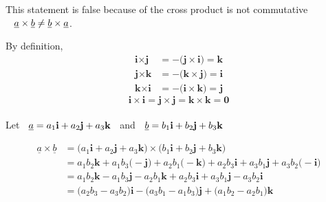 \documentclass[11pt,a4paper]{article}
\begin{document}
This statement is false because of the cross product is not commutative $\hspace{0.3cm} \underline{a}\times \underline{b} \neq \underline{b}\times \underline{a}$.

\begin{figure}[H]
\centering
{}
\end{figure}


















By definition, 
\begin{align*}
\textbf{i} \times \textbf{j} & = -\big(\textbf{j} \times \textbf{i}\big) = \textbf{k}\\
\textbf{j} \times \textbf{k} & = -\big(\textbf{k} \times \textbf{j}\big) = \textbf{i}\\
\textbf{k} \times \textbf{i} & = -\big(\textbf{i} \times \textbf{k}\big) = \textbf{j}
\end{align*}
$$\textbf{i} \times \textbf{i} = \textbf{j} \times \textbf{j} = \textbf{k} \times \textbf{k} = \textbf{0}$$\\



Let $\hspace{0.2cm} \underline{a} = a_1 \textbf{i} + a_2\textbf{j} + a_3\textbf{k}\hspace{0.2cm}$ and  $\hspace{0.2cm} \underline{b} = b_1 \textbf{i} + b_2\textbf{j} + b_3\textbf{k}\hspace{0.2cm}$

\begin{align*}
\underline{a}\times \underline{b} & = \big( a_1 \textbf{i} + a_2\textbf{j} + a_3\textbf{k}\big)\times \big(b_1 \textbf{i} + b_2\textbf{j} + b_3\textbf{k}\big)\\
& = a_1b_2\textbf{k} +  a_1b_3\big(-\textbf{j}\big) +  a_2b_1\big(-\textbf{k}\big) +  a_2b_3\textbf{i}  +  a_3b_1\textbf{j}  +  a_3b_2\big(-\textbf{i} \big)\\
& = a_1b_2\textbf{k} -  a_1b_3\textbf{j} - a_2b_1\textbf{k} +  a_2b_3\textbf{i}  +  a_3b_1\textbf{j}  -  a_3b_2\textbf{i}\\
& = \big(a_2b_3 - a_3b_2\big)\textbf{i} - \big(a_3b_1 - a_1b_3\big)\textbf{j}  + \big(a_1b_2 - a_2b_1\big)\textbf{k} 
\end{align*}
\end{document}

